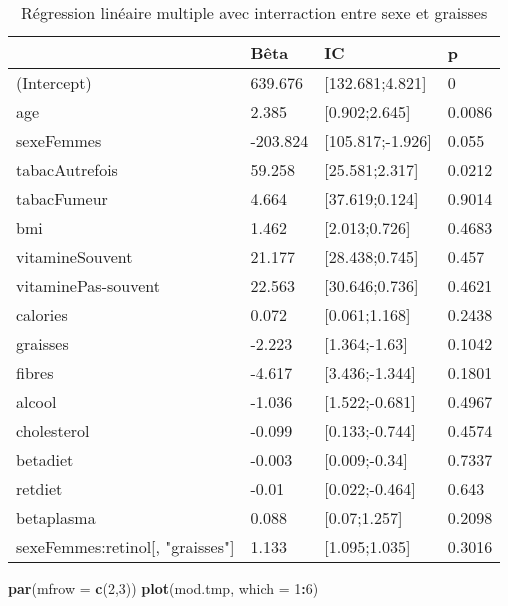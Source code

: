 \documentclass[]{article}
\newenvironment{Shaded}{\begin{snugshade}}{\end{snugshade}}
\newcommand{\KeywordTok}[1]{\textcolor[rgb]{0.13,0.29,0.53}{\textbf{#1}}}
\newcommand{\DataTypeTok}[1]{\textcolor[rgb]{0.13,0.29,0.53}{#1}}
\newcommand{\DecValTok}[1]{\textcolor[rgb]{0.00,0.00,0.81}{#1}}
\newcommand{\OperatorTok}[1]{\textcolor[rgb]{0.81,0.36,0.00}{\textbf{#1}}}
\newcommand{\NormalTok}[1]{#1}
\begin{document}
\begin{table}

\caption{\label{tab:unnamed-chunk-64}Régression linéaire multiple avec interraction entre sexe et graisses}
\centering
\begin{tabular}[t]{l|l|l|l}
\hline
  & Bêta & IC & p\\
\hline
\rowcolor[HTML]{BBD2E1}  (Intercept) & 639.676 & [132.681;4.821] & 0\\
\hline
age & 2.385 & [0.902;2.645] & 0.0086\\
\hline
\rowcolor[HTML]{BBD2E1}  sexeFemmes & -203.824 & [105.817;-1.926] & 0.055\\
\hline
tabacAutrefois & 59.258 & [25.581;2.317] & 0.0212\\
\hline
\rowcolor[HTML]{BBD2E1}  tabacFumeur & 4.664 & [37.619;0.124] & 0.9014\\
\hline
bmi & 1.462 & [2.013;0.726] & 0.4683\\
\hline
\rowcolor[HTML]{BBD2E1}  vitamineSouvent & 21.177 & [28.438;0.745] & 0.457\\
\hline
vitaminePas-souvent & 22.563 & [30.646;0.736] & 0.4621\\
\hline
\rowcolor[HTML]{BBD2E1}  calories & 0.072 & [0.061;1.168] & 0.2438\\
\hline
graisses & -2.223 & [1.364;-1.63] & 0.1042\\
\hline
\rowcolor[HTML]{BBD2E1}  fibres & -4.617 & [3.436;-1.344] & 0.1801\\
\hline
alcool & -1.036 & [1.522;-0.681] & 0.4967\\
\hline
\rowcolor[HTML]{BBD2E1}  cholesterol & -0.099 & [0.133;-0.744] & 0.4574\\
\hline
betadiet & -0.003 & [0.009;-0.34] & 0.7337\\
\hline
\rowcolor[HTML]{BBD2E1}  retdiet & -0.01 & [0.022;-0.464] & 0.643\\
\hline
betaplasma & 0.088 & [0.07;1.257] & 0.2098\\
\hline
\rowcolor[HTML]{BBD2E1}  sexeFemmes:retinol[, "graisses"] & 1.133 & [1.095;1.035] & 0.3016\\
\hline
\end{tabular}
\end{table}

\begin{Shaded}
\begin{Highlighting}[]
\KeywordTok{par}\NormalTok{(}\DataTypeTok{mfrow =} \KeywordTok{c}\NormalTok{(}\DecValTok{2}\NormalTok{,}\DecValTok{3}\NormalTok{))}
\KeywordTok{plot}\NormalTok{(mod.tmp, }\DataTypeTok{which =} \DecValTok{1}\OperatorTok{:}\DecValTok{6}\NormalTok{)}
\end{Highlighting}
\end{Shaded}
\end{document}
